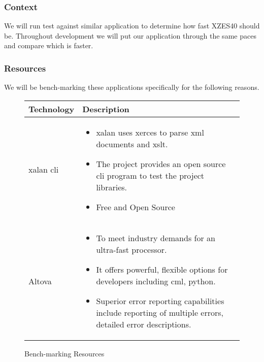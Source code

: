 \subsubsection{Context}

We will run test against similar application to determine how fast XZES40 should be.
Throughout development we will put our application through the same paces and compare which is faster.

\subsubsection{Resources}

We will be bench-marking these applications specifically for the following reasons.

\begin{figure}
  \centering
  \begin{tabular}{ | l | p{10cm} |}
    \hline
    Technology & Description  \\ \hline
    \gls{xalan} \gls{cli}&
    \begin{itemize}
      \item \gls{xalan} uses \gls{xerces} to parse \gls{xml} documents and \gls{xslt}.
      \item The project provides an open source \gls{cli} program to test the project libraries.
      \item Free and Open Source
    \end{itemize}\\ \hline
    Altova &
    \begin{itemize}
      \item To meet industry demands for an ultra-fast processor.
      \item It offers powerful, flexible options for developers including cml, python.
      \item Superior error reporting capabilities include reporting of multiple errors, detailed error descriptions.
    \end{itemize} \\ \hline
  \end{tabular}
  \caption{Bench-marking Resources}
\end{figure}


